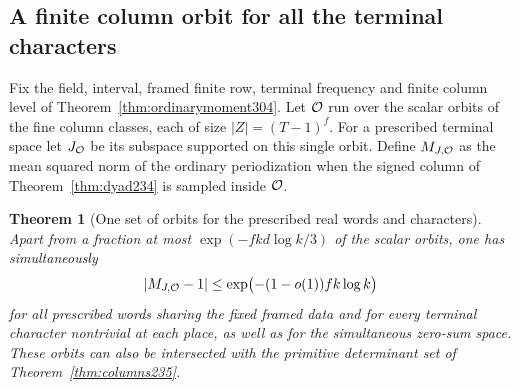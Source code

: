 \documentclass[a4paper,11pt]{article}
\newtheorem{theorem}[proposition]{Theorem}
\theoremstyle{definition}
\theoremstyle{remark}
\numberwithin{equation}{section}
\begin{document}
\subsection{A finite column orbit for all the terminal characters}\label{nav:I-73}
Fix the field, interval, framed finite row, terminal frequency
and finite column level of Theorem~\ref{thm:ordinarymoment304}.
Let \({\cal O}\) run over the scalar orbits of the fine column
classes, each of size \(|Z|=(T-1)^f\). For a prescribed
terminal space let \(J_{\cal O}\) be its subspace supported
on this single orbit. Define \(M_{J,{\cal O}}\) as the mean
squared norm of the ordinary periodization when the signed
column of Theorem~\ref{thm:dyad234} is sampled inside
\({\cal O}\).

\begin{theorem}[One set of orbits for the prescribed real words and characters]\leavevmode
\label{thm:commonorbit305}
Apart from a fraction at most \(\exp(-fkd\log k/3)\) of
the scalar orbits, one has simultaneously
\[
             |M_{J,{\cal O}}-1|
                   \le \exp\bigl(-(1-o(1))fk\log k\bigr)
\]
for all prescribed words sharing the fixed framed data and for
every terminal character nontrivial at each place, as well as
for the simultaneous zero-sum space. These orbits can also
be intersected with the primitive determinant set of
Theorem~\ref{thm:columns235}.
\end{theorem}
\end{document}

